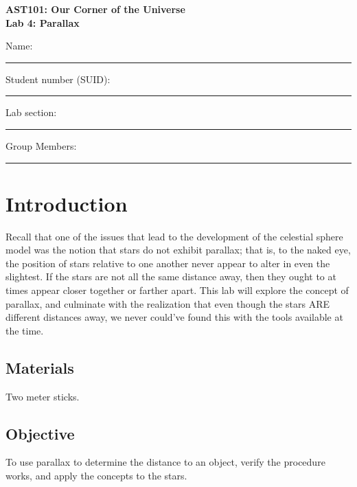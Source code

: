 \documentclass[11pt]{article}
\begin{document}
\begin{center}
\textbf{\Large
AST101: Our Corner of the Universe \\
\vspace*{0.1cm}
Lab 4: Parallax
}
\end{center}

\vspace*{0.5cm}

{\Large Name:}\vspace*{0.5cm}\\\hrule
{\Large Student number (SUID):}\vspace*{0.5cm}\\\hrule
{\Large Lab section:}\vspace*{0.5cm}\\\hrule
{\Large Group Members:}\vspace*{0.5cm}\\\hrule
\vspace*{0.5cm}

\section{Introduction}

Recall that one of the issues that lead to the development of the celestial sphere model was the notion that stars do not exhibit parallax; that is, to the naked eye, the position of stars relative to one another never appear to alter in even the slightest. If the stars are not all the same distance away, then they ought to at times appear closer together or farther apart. This lab will explore the concept of parallax, and culminate with the realization that even though the stars ARE different distances away, we never could've found this with the tools available at the time. 

\subsection*{Materials}

Two meter sticks.

\subsection*{Objective}

To use parallax to determine the distance to an object, verify the procedure works, and apply the concepts to the stars.
\end{document}

